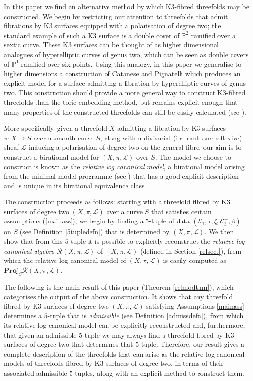 \documentclass{amsart}
\begin{document}
In this paper we find an alternative method by which K3-fibred threefolds may be constructed. We begin by restricting our attention to threefolds that admit fibrations by K3 surfaces equipped with a polarisation of degree two; the standard example of such a K3 surface is a double cover of ${\mathbb{P}}^2$ ramified over a sextic curve. These K3 surfaces can be thought of as higher dimensional analogues of hyperelliptic curves of genus two, which can be seen as double covers of ${\mathbb{P}}^1$ ramified over six points. Using this analogy, in this paper we generalise to higher dimensions a construction of Catanese and Pignatelli \cite{flgi} which produces an explicit model for a surface admitting a fibration by hyperelliptic curves of genus two. This construction should provide a more general way to construct K3-fibred threefolds than the toric embedding method, but remains explicit enough that many properties of the constructed threefolds can still be easily calculated (see \cite[Chapter 5]{mythesis}).

More specifically, given a threefold $X$ admitting a fibration by K3 surfaces $\pi\colon X \to S$ over a smooth curve $S$, along with a divisorial (i.e. rank one reflexive) sheaf ${\mathcal{L}}$ inducing a polarisation of degree two on the general fibre, our aim is to construct a birational model for $(X,\pi,{\mathcal{L}})$ over $S$. The model we choose to construct is known as the \emph{relative log canonical model}, a birational model arising from the minimal model programme (see \cite[Section 3.8]{bgav}) that has a good explicit description and is unique in its birational equivalence class.

The construction proceeds as follows: starting with a threefold fibred by K3 surfaces of degree two $(X,\pi,{\mathcal{L}})$ over a curve $S$ that satisfies certain assumptions (\ref{mainass}), we begin by finding a $5$-tuple of data $({\mathcal{E}}_1,\tau,\xi,{\mathcal{E}}_3^+,\beta)$ on $S$ (see Definition \ref{5tupledefn}) that is determined by $(X,\pi,{\mathcal{L}})$. We then show that from this $5$-tuple it is possible to explicitly reconstruct the \emph{relative log canonical algebra} ${\mathcal{R}}(X,\pi,{\mathcal{L}})$ of $(X,\pi,{\mathcal{L}})$ (defined in Section \ref{relsect}), from which the relative log canonical model of $(X,\pi,{\mathcal{L}})$ is easily computed as $\mathbf{Proj}_S {\mathcal{R}}(X,\pi,{\mathcal{L}})$.

The following is the main result of this paper (Theorem \ref{relmodthm}), which categorises the output of the above construction. It shows that any threefold fibred by K3 surfaces of degree two $(X,\pi,{\mathcal{L}})$ satisfying Assumptions \ref{mainass} determines a $5$-tuple that is \emph{admissible} (see Definition \ref{admissdefn}), from which its relative log canonical model can be explicitly reconstructed and, furthermore, that given an admissible $5$-tuple we may always find a threefold fibred by K3 surfaces of degree two that determines that $5$-tuple. Therefore, our result gives a complete description of the threefolds that can arise as the relative log canonical models of threefolds fibred by K3 surfaces of degree two, in terms of their associated admissible $5$-tuples, along with an explicit method to construct them.
\end{document}
